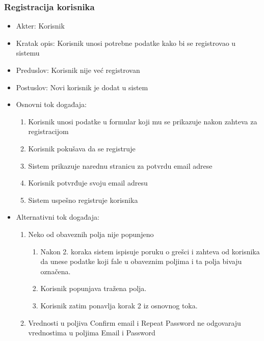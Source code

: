 \documentclass[a4paper]{article}
\begin{document}
\subsubsection{Registracija korisnika}
\begin{itemize}
    \item Akter: Korisnik
    \item Kratak opis: Korisnik unosi potrebne podatke kako bi se registrovao u sistemu
    \item Preduslov: Korisnik nije već registrovan
    \item Postuslov: Novi korisnik je dodat u sistem
    \item Osnovni tok događaja:
        \begin{enumerate}
            \item Korisnik unosi podatke u formular koji mu se prikazuje nakon zahteva za registracijom %
            \item Korisnik pokušava da se registruje
            \item Sistem prikazuje narednu stranicu za potvrdu email adrese
            \item Korisnik potvrđuje svoju email adresu
            \item Sistem uspešno registruje korisnika
        \end{enumerate}
    \item Alternativni tok događaja:
        \begin{enumerate}
            \item Neko od obaveznih polja nije popunjeno
                \begin{enumerate}
                    \item Nakon 2. koraka sistem ispisuje poruku o grešci i zahteva od korisnika da unese podatke koji fale u obaveznim poljima i ta polja bivaju označena.
                    \item Korisnik popunjava tražena polja.
                    \item Korisnik zatim ponavlja korak 2 iz osnovnog toka.
                \end{enumerate}
            \item Vrednosti u poljiva Confirm email i Repeat Password ne odgovaraju vrednostima u poljima Email i Password
                \begin{enumerate}

\end{enumerate}
\end{enumerate}
\end{itemize}
\end{document}
